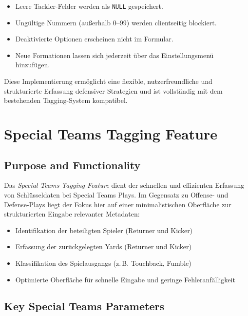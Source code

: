 \begin{itemize}
  \item Leere Tackler-Felder werden als \texttt{NULL} gespeichert.
  \item Ungültige Nummern (außerhalb 0–99) werden clientseitig blockiert.
  \item Deaktivierte Optionen erscheinen nicht im Formular.
  \item Neue Formationen lassen sich jederzeit über das Einstellungsmenü hinzufügen.
\end{itemize}

\bigskip

Diese Implementierung ermöglicht eine flexible, nutzerfreundliche und strukturierte Erfassung defensiver Strategien und ist vollständig mit dem bestehenden Tagging-System kompatibel.

\section{Special Teams Tagging Feature}

\subsection{Purpose and Functionality}

Das \textit{Special Teams Tagging Feature} dient der schnellen und effizienten Erfassung von Schlüsseldaten bei Special Teams Plays. Im Gegensatz zu Offense- und Defense-Plays liegt der Fokus hier auf einer minimalistischen Oberfläche zur strukturierten Eingabe relevanter Metadaten:

\begin{itemize}
  \item Identifikation der beteiligten Spieler (Returner und Kicker)
  \item Erfassung der zurückgelegten Yards (Returner und Kicker)
  \item Klassifikation des Spielausgangs (z.\,B. Touchback, Fumble)
  \item Optimierte Oberfläche für schnelle Eingabe und geringe Fehleranfälligkeit
\end{itemize}

\subsection{Key Special Teams Parameters}

